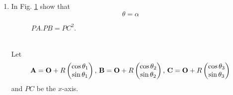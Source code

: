 \begin{enumerate}[label=\thesection.\arabic*.,ref=\thesection.\theenumi]
\item
In Fig. \ref{fig:circ_tang_icept} show that 
%
\begin{equation}
\theta = \alpha
\end{equation}
%
\label{them:tang_icept_ang}
	\begin{figure}[!ht]
		\begin{center}
			
			\resizebox{\columnwidth}{!}{}
		\end{center}
		\caption{$PA.PB = PC^2$.}
		\label{fig:circ_tang_icept}	
	\end{figure}
	\\
	\solution
	Let 
  \begin{align}
	  \mathbf{A} = \mathbf{O}+R\begin{pmatrix}\cos \theta_1 \\ \sin \theta_1\end{pmatrix},\,
	  \mathbf{B} = \mathbf{O}+R \begin{pmatrix}\cos \theta_2 \\ \sin \theta_2\end{pmatrix},\,
	  \mathbf{C} = \mathbf{O}+R \begin{pmatrix}\cos \theta_3 \\ \sin \theta_3\end{pmatrix}
  \end{align}
  and $PC$ be the $x$-axis.
	\iffalse

%
\solution Obvious from the figure once we observe that $\triangle OAC$ is isosceles.
%
%
\item
	In Fig. \ref{fig:circ_tang_icept}, show that $PA.PB = PC^2$.
\label{them:circ_tang_icept_prod}	
\solution Using Theorem \ref{them:tang_icept_ang},
\begin{equation}
\triangle PAC \sim \triangle PBC \quad (AAA)
\end{equation}
 Hence,
%
\begin{align}
\frac{PA}{PC} &= \frac{PC}{PB} \\
\implies PA.PB &=PC^2
\end{align}
%
%
%
\item
	In Fig. \ref{fig:chord_tang_prod}, show that
\begin{equation}
	PA.PB = PC.PD
	\end{equation}

%
\begin{figure}[!ht]
	\begin{center}
		
		\resizebox{\columnwidth}{!}{}
	\end{center}
	\caption{$PA.PB = PC^2$.}
	\label{fig:chord_tang_prod}	
\end{figure}

\solution From Theorem \ref{them:circ_tang_icept_prod}, if $PT$ be a tangent to the circle, 	
\begin{equation}
	PA.PB = PT^2 =PC.PD
	\end{equation}
	\fi
\end{enumerate}
